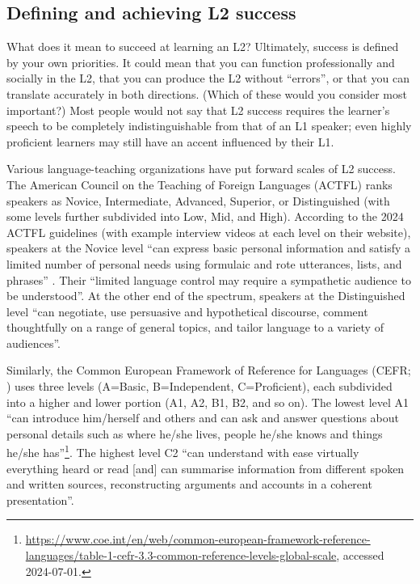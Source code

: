\subsection{Defining and achieving L2 success}

What does it  mean to succeed at learning an L2?  Ultimately, success is defined by your own priorities.  It could mean that you can function professionally and socially in the L2, that you can produce the L2 without  ``errors'',  or that you can translate  accurately in both directions.  (Which of these would you consider most important?)  Most people would not say that L2 success requires the learner's speech to be completely indistinguishable from that of an L1 speaker; even highly proficient learners may still have an accent influenced by their L1.
 

Various language-teaching organizations have  put forward scales of L2 success.
The American Council on the Teaching of Foreign Languages (ACTFL) ranks speakers as Novice, Intermediate, Advanced, Superior,  or Distinguished (with some levels further subdivided into Low, Mid, and High).  According to the 2024 ACTFL guidelines (with example interview videos at each level on their website), speakers at the  Novice level ``can express basic personal information and satisfy a limited number of
personal needs using formulaic and rote utterances, lists, and phrases'' \citep{ACTFL}.  Their ``limited language control may require a sympathetic
audience to be understood''.  At the other end of the spectrum,  speakers at the Distinguished level ``can negotiate, use persuasive and hypothetical discourse, comment thoughtfully on a range of general topics, and tailor language to a variety of audiences''.

Similarly, the Common European Framework of Reference for Languages (CEFR; \citealt{CEFR}) uses three levels (A=Basic, B=Independent, C=Proficient), each subdivided into a higher and lower portion (A1, A2, B1, B2, and so on).  The lowest level A1 ``can introduce him/herself and others and can ask and answer questions about personal details such as where he/she lives, people he/she knows and things he/she has''\footnote{\url{https://www.coe.int/en/web/common-european-framework-reference-languages/table-1-cefr-3.3-common-reference-levels-global-scale}, accessed 2024-07-01.}. The highest level C2 ``can understand with ease virtually everything heard or read [and] can summarise information from different spoken and written sources, reconstructing arguments and accounts in a coherent presentation''.

